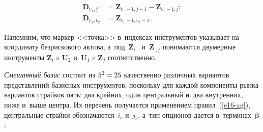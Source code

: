 \begin{multicols}{2}
\begin{itemize}
  \noindent
    \begin{align*}
  \boldsymbol{D}_{v_1,j} & = \boldsymbol{Z}_{v_1-1,j-1} - \boldsymbol{Z}_{v_1-1,j};\\
  \boldsymbol{D}_{v_1,v_2}& = \boldsymbol{Z}_{v_1-1,v_2-1}. 
  \end{align*}
  \end{itemize}
  
  \vspace*{-8pt}
  
  Напомним, что маркер <<точка>> в~индексах инструментов указывает на 
координату безрискового актива, а~под~$\boldsymbol{Z}_{i,\cdot}$ и~$\boldsymbol{Z}_{\cdot,j}$ 
понимаются двумерные инструменты $\boldsymbol{Z}_i\times \boldsymbol{U}_2$ 
и~$\boldsymbol{U}_1\times\boldsymbol{Z}_j$ соответственно. 
  
  \textit{Смешанный базис} состоит из $5^2\hm = 25$ качественно различных 
вариантов представлений базисных инструментов, поскольку для каждой 
компоненты рынка вариантов страйков пять: два крайних, один центральный 
и~два внутренних, ниже и~выше центра. Их перечень получается применением 
правил~(\ref{e16-ag}), центральные страйки обозначаются~$i_c$ и~$j_c$, а~тип 
опционов дается в~терминах~$\boldsymbol{\beta}$:

\vspace*{-8pt}


\end{multicols}
